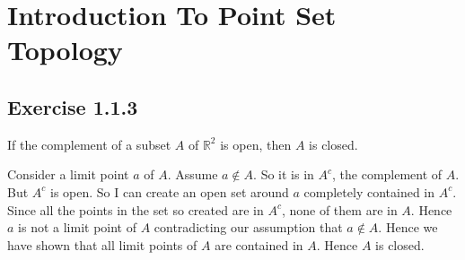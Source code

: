 \section*{Introduction To Point Set Topology}
\subsection*{Exercise 1.1.3}
If the complement of a subset $A$ of $\mathbb{R}^2$ is open, then $A$ is closed.

Consider a limit point $a$ of $A$. Assume $a \notin A$. So it is in $A^c$, the complement of $A$. But $A^c$ is open. So I can create an open set around $a$ completely contained in $A^c$. Since all the points in the set so created are in $A^c$, none of them are in $A$. Hence $a$ is not a limit point of $A$ contradicting our assumption that $a \notin A$. Hence we have shown that all limit points of $A$ are contained in $A$. Hence $A$ is closed.

